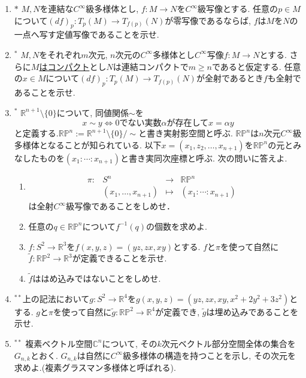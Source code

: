 \documentclass[dvipdfmx,a4paper,11pt]{article}
\newcommand{\R}{\mathbb{R}}
\newcommand{\C}{\mathbb{C}}
\theoremstyle{definition}
\begin{document}
\begin{enumerate}[label=\textbf{問}1.\arabic*]
\item $*$ $M,N$を連結な$C^\infty$級多様体とし, $f : M \rightarrow N$を$C^\infty$級写像とする. 任意の$p \in M$について$(df)_{p} : T_{p}(M) \rightarrow T_{f(p)}(N)$が零写像であるならば, $f$は$M$を$N$の一点へ写す定値写像であることを示せ. 

\item $^{*}$  $M,N$をそれぞれ$m$次元, $n$次元の$C^{\infty}$多様体とし$C^{\infty}$写像$f : M \rightarrow N$とする. さらに\underline{$M$はコンパクト}とし$N$は連結コンパクトで$m \ge n$であると仮定する.
任意の$x \in M$について$(df)_{p} : T_{p}(M) \rightarrow T_{f(p)}(N)$が全射であるとき$f$も全射であることを示せ. 

\item $^{*}$  $\R^{n+1} \setminus \{ 0\}$について, 同値関係$\sim$を
	$$
	x \sim y \Leftrightarrow \text{0でない実数$\alpha$が存在して$x = \alpha y$}
	$$
	と定義する.$ \R\mathbb{P}^{n}:= \R^{n+1} \setminus \{ 0\}/\sim$と書き実射影空間と呼ぶ.  $ \R\mathbb{P}^{n}$は$n$次元$C^{\infty}$級多様体となることが知られている.  以下$x= (x_{1}, z_{2}, \ldots, x_{n+1})$を$\R\mathbb{P}^{n}$の元とみなしたものを$(x_{1}: \cdots : x_{n+1})$と書き実同次座標と呼ぶ. 
	次の問いに答えよ.
	\begin{enumerate}
	\item 
	$$
\begin{array}{ccccc}
\pi: &S^{n}& \rightarrow & \R\mathbb{P}^{n}& \\
&(x_{1}, \ldots, x_{n+1}) & \longmapsto & 
(x_{1}: \cdots : x_{n+1})&
\end{array}
$$
は全射$C^{\infty}$級写像であることをしめせ．
	\item 任意の$q \in \R\mathbb{P}^{n}$について$f^{-1}(q)$の個数を求めよ.
	\item $f : S^2 \rightarrow \R^3$を$f(x,y,z)=(yz,zx,xy)$とする. $f$と$\pi$を使って自然に$\tilde{f}: \R\mathbb{P}^{2} \rightarrow \R^3$が定義できることを示せ. 
	\item $\tilde{f}$ははめ込みではないことをしめせ.
	\end{enumerate}
\item$^{**}$上の記法において$g : S^2 \rightarrow \R^4$を$g(x,y,z)=(yz,zx,xy, x^2+2y^2 + 3z^2)$とする. $g$と$\pi$を使って自然に$\tilde{g}: \R\mathbb{P}^{2} \rightarrow \R^4$が定義でき, $\tilde{g}$は埋め込みであることを示せ.

\item$^{**}$ 複素ベクトル空間$\C^{n}$について, その$k$次元ベクトル部分空間全体の集合を$G_{n,k}$とおく. $G_{n,k}$は自然に$C^{\infty}$級多様体の構造を持つことを示し, その次元を求めよ.(複素グラスマン多様体と呼ばれる).


\end{enumerate}
\end{document}
